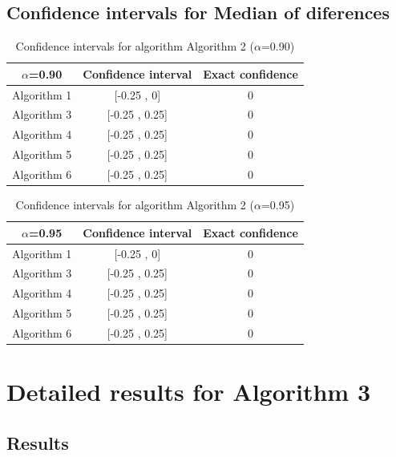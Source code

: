 \documentclass[a4paper,10pt]{article}
\begin{document}
\subsection{Confidence intervals for Median of diferences}

\begin{table}[!htp]
\centering\small
\begin{tabular}{
|c|c|c|}
\hline
 $\alpha$=0.90 & Confidence interval & Exact confidence \\ \hline 
Algorithm 1 & [-0.25 , 0] & 0\\ \hline 
Algorithm 3 & [-0.25 , 0.25] & 0\\ \hline 
Algorithm 4 & [-0.25 , 0.25] & 0\\ \hline 
Algorithm 5 & [-0.25 , 0.25] & 0\\ \hline 
Algorithm 6 & [-0.25 , 0.25] & 0\\ \hline 

\end{tabular}
\caption{Confidence intervals for algorithm Algorithm 2 ($\alpha$=0.90)}
\end{table}
\begin{table}[!htp]
\centering\small
\begin{tabular}{
|c|c|c|}
\hline
 $\alpha$=0.95 & Confidence interval & Exact confidence \\ \hline 
Algorithm 1 & [-0.25 , 0] & 0\\ \hline 
Algorithm 3 & [-0.25 , 0.25] & 0\\ \hline 
Algorithm 4 & [-0.25 , 0.25] & 0\\ \hline 
Algorithm 5 & [-0.25 , 0.25] & 0\\ \hline 
Algorithm 6 & [-0.25 , 0.25] & 0\\ \hline 

\end{tabular}
\caption{Confidence intervals for algorithm Algorithm 2 ($\alpha$=0.95)}
\end{table}

 \clearpage 


\section{Detailed results for Algorithm 3}


\subsection{Results}
\end{document}
